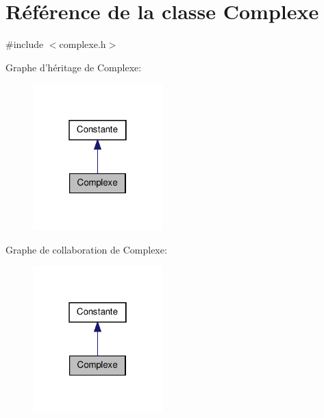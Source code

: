 \hypertarget{class_complexe}{\section{\-Référence de la classe \-Complexe}
\label{class_complexe}
}


{\ttfamily \#include $<$complexe.\-h$>$}



\-Graphe d'héritage de \-Complexe\-:\nopagebreak
\begin{figure}[H]
\begin{center}
\leavevmode
\includegraphics[width=142pt]{class_complexe__inherit__graph}
\end{center}
\end{figure}


\-Graphe de collaboration de \-Complexe\-:\nopagebreak
\begin{figure}[H]
\begin{center}
\leavevmode
\includegraphics[width=142pt]{class_complexe__coll__graph}
\end{center}
\end{figure}
